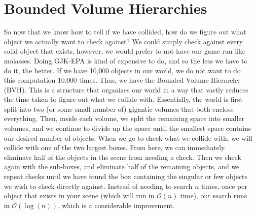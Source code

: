 \documentclass{article}
\begin{document}
\section{Bounded Volume Hierarchies}
So now that we know how to tell if we have collided, how do we figure out what object we actually want to check against? We could simply check against every solid object that exists, however, we would prefer to not have our game run like molasses. Doing GJK-EPA is kind of expensive to do, and so the less we have to do it, the better. If we have 10,000 objects in our world, we do not want to do this computation 10,000 times. Thus, we have the Bounded Volume Hierarchy (BVH). This is a structure that organizes our world in a way that vastly reduces the time taken to figure out what we collide with. Essentially, the world is first split into two (or some small number of) gigantic volumes that both enclose everything. Then, inside each volume, we split the remaining space into smaller volumes, and we continue to divide up the space until the smallest space contains our desired number of objects. When we go to check what we collide with, we will collide with one of the two largest boxes. From here, we can immediately eliminate half of the objects in the scene from needing a check. Then we check again with the sub-boxes, and eliminate half of the remaining objects, and we repeat checks until we have found the box containing the singular or few objects we wish to check directly against. Instead of needing to search $n$ times, once per object that exists in your scene (which will run in $\mathcal{O}(n)$ time), our search runs in $\mathcal{O}(\log(n))$, which is a considerable improvement.
\end{document}
